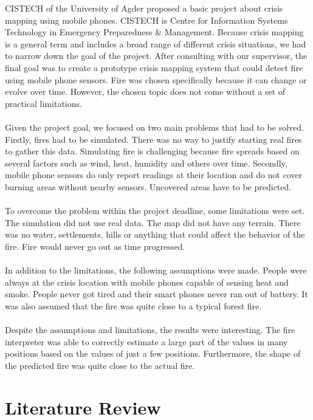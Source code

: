CISTECH of the University of Agder proposed a basic project about crisis mapping using mobile phones. CISTECH is Centre for Information Systems Technology in Emergency Preparedness \& Management. Because crisis mapping is a general term and includes a broad range of different crisis situations, we had to narrow down the goal of the project. After consulting with our supervisor, the final goal was to create a prototype crisis mapping system that could detect fire using mobile phone sensors. Fire was chosen specifically because it can change or evolve over time. However, the chosen topic does not come without a set of practical limitations.
\\\\
Given the project goal, we focused on two main problems that had to be solved. Firstly, fires had to be simulated. There was no way to justify starting real fires to gather this data. Simulating fire is challenging because fire spreads based on several factors such as wind, heat, humidity and others over time. Secondly, mobile phone sensors do only report readings at their location and do not cover burning areas without nearby sensors. Uncovered areas have to be predicted.
\\\\
To overcome the problem within the project deadline, some limitations were set. The simulation did not use real data. The map did not have any terrain. There was no water, settlements, hills or anything that could affect the behavior of the fire. Fire would never go out as time progressed.
\\\\
In addition to the limitations, the following assumptions were made. People were always at the crisis location with mobile phones capable of sensing heat and smoke. People never got tired and their smart phones never ran out of battery. It was also assumed that the fire was quite close to a typical forest fire.
\\\\
Despite the assumptions and limitations, the results were interesting. The fire interpreter was able to correctly estimate a large part of the values in many positions based on the values of just a few positions. Furthermore, the shape of the predicted fire was quite close to the actual fire.

\section{Literature Review}

